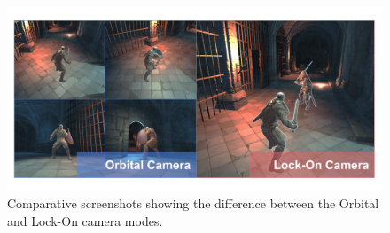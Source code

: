 \begin{figure}[!h]
    \caption{Comparative screenshots showing the difference between the Orbital and Lock-On camera modes.}
    \vspace{0.5em}
    \begin{center}
        \includegraphics[width=36em]{figures/fig-camera-types.png}
    \end{center}
    \label{fig:camera-types}
\end{figure}



